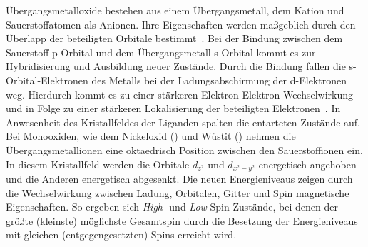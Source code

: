         Übergangsmetalloxide bestehen aus einem Übergangsmetall, dem Kation und Sauerstoffatomen als Anionen.
        Ihre Eigenschaften werden maßgeblich durch den Überlapp der beteiligten Orbitale bestimmt~\cite{kupper_electronic_2005}.
        Bei der Bindung zwischen dem Sauerstoff p-Orbital und dem Übergangsmetall s-Orbital kommt es zur Hybridisierung und Ausbildung neuer Zustände.
        Durch die Bindung fallen die s-Orbital-Elektronen des Metalls bei der Ladungsabschirmung der d-Elektronen weg.
        Hierdurch kommt es zu einer stärkeren Elektron-Elektron-Wechselwirkung und in Folge zu einer stärkeren Lokalisierung der beteiligten Elektronen~\cite{dane_beschreibung_2008}.
        In Anwesenheit des Kristallfeldes der Liganden spalten die entarteten Zustände auf.
        Bei Monooxiden, wie dem Nickeloxid () und Wüstit () nehmen die Übergangsmetallionen eine oktaedrisch Position zwischen den Sauerstoffionen ein.
        In diesem Kristallfeld werden die Orbitale $d_{z^2}$ und $d_{x^2-y^2}$ energetisch angehoben und die Anderen energetisch abgesenkt.
        Die neuen Energieniveaus zeigen durch die Wechselwirkung zwischen Ladung, Orbitalen, Gitter und Spin magnetische Eigenschaften.
        So ergeben sich \textit{High}- und \textit{Low}-Spin Zustände, bei denen der größte (kleinste) möglichste Gesamtspin durch die Besetzung der Energieniveaus mit gleichen (entgegengesetzten) Spins erreicht wird.

